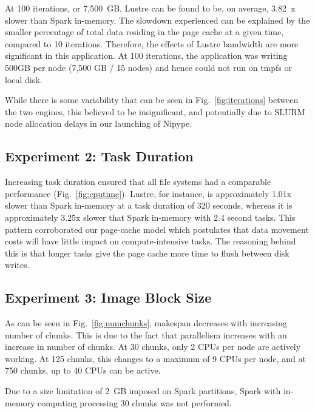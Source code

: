 \documentclass{IEEEtran}
\begin{document}
At 100 iterations, or 7,500~GB, Lustre can be found to be, on average, 3.82~x 
slower than Spark in-memory. The 
slowdown experienced can be explained by the smaller percentage of total data 
residing in the page cache at a given time, compared to 10 iterations. 
Therefore, the effects of Lustre bandwidth are more significant in 
this application. At 100 iterations, the application was writing 500GB 
per node (7,500 GB / 15 nodes) and hence could not run on tmpfs or local disk.

While there is some variability that can be seen in Fig.~\ref{fig:iterations} 
between the two engines, this believed to be insignificant, and potentially due 
to SLURM node allocation delays in our launching of Nipype.


\subsection{Experiment 2: Task Duration}
%

Increasing task duration ensured that all file systems had a comparable performance
(Fig.~\ref{fig:cputime}). Lustre, for instance, is approximately 1.01x slower
than Spark in-memory at a task duration of 320 seconds, whereas it is 
approximately 3.25x slower that Spark in-memory with 2.4 second tasks. This 
pattern corroborated our page-cache model which postulates that 
data movement costs will have little impact on compute-intensive tasks. The 
reasoning behind this is that longer tasks give the page cache more time to flush 
between disk writes.

\subsection{Experiment 3: Image Block Size}

As can be seen in Fig.~\ref{fig:numchunks}, makespan decreases with increasing
number of chunks. This is due to the fact that parallelism 
increases with an increase in number of chunks. At 30 chunks, 
only 2 CPUs per node are actively working. At 125 chunks, this changes 
to a maximum of 9 CPUs per node, and at 750 chunks, up to 40 CPUs can be 
active.

Due to a size limitation of 2~GB imposed on Spark partitions, Spark with in-memory
computing processing 30 chunks was not performed.
\end{document}
